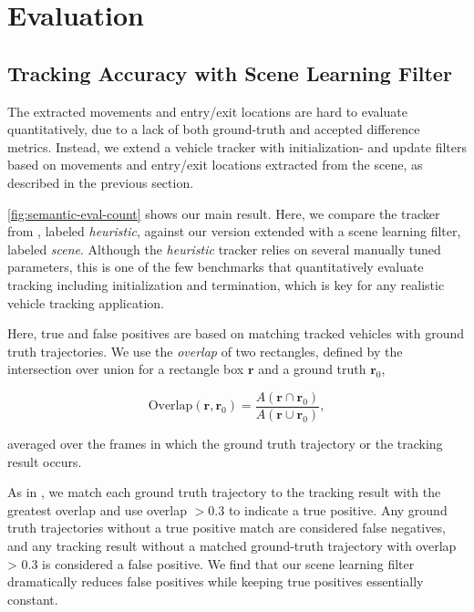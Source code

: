 \section{Evaluation}
\label{sec:semantic-eval}


\subsection{Tracking Accuracy with Scene Learning Filter}

The extracted movements and entry/exit locations are hard to evaluate quantitatively, due to a lack of both ground-truth and accepted difference metrics.
Instead, we extend a vehicle tracker with initialization- and update filters based on movements and entry/exit locations extracted from the scene, as described in the previous section.



\ref{fig:semantic-eval-count} shows our main result. Here, we compare the tracker from \cite{yanziVehicleTracker}, labeled {\it heuristic}, against our version extended with a scene learning filter, labeled {\it scene}. 
Although the {\it heuristic} tracker relies on several manually tuned parameters, this is one of the few benchmarks that quantitatively evaluate tracking including initialization and termination, which is key for any realistic vehicle tracking application.

Here, true and false positives are based on matching tracked vehicles with ground truth trajectories.
We use the {\it overlap} of two rectangles, defined by the intersection over union for a rectangle box $\bm{r}$ and a ground truth $\bm{r}_0$,

$$\text{Overlap}(\bm{r}, \bm{r}_0) = \frac{A(\bm{r} \cap \bm{r}_0)}{A(\bm{r} \cup \bm{r}_0)},$$

averaged over the frames in which the ground truth trajectory or the tracking result occurs. 

As in \cite{yanziVehicleTracker}, we match each ground truth trajectory to the tracking result with the greatest overlap and use overlap $> 0.3$ to indicate a true positive. Any ground truth trajectories without a true positive match are considered false negatives, and any tracking result without a matched ground-truth trajectory with overlap > 0.3 is considered a false positive.
We find that our scene learning filter dramatically reduces false positives while keeping true positives essentially constant. 

